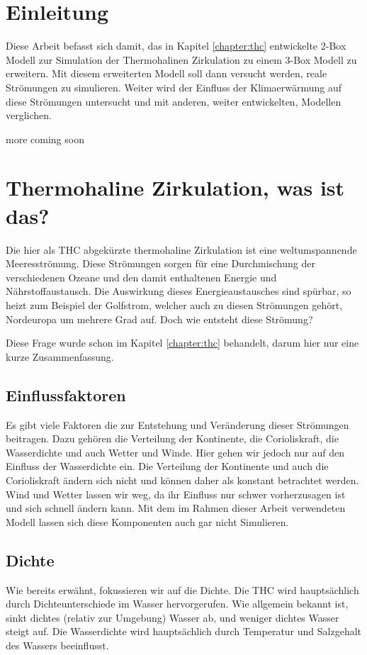 \section{Einleitung}

Diese Arbeit befasst sich damit, das in Kapitel \ref{chapter:thc} entwickelte 2-Box Modell zur Simulation der Thermohalinen Zirkulation zu einem 3-Box Modell zu erweitern. Mit diesem erweiterten Modell soll dann versucht werden, reale Strömungen zu simulieren. Weiter wird der Einfluss der Klimaerwärmung auf diese Strömungen untersucht und mit anderen, weiter entwickelten, Modellen verglichen.

more coming soon

\section{Thermohaline Zirkulation, was ist das?}

Die hier als THC abgekürzte thermohaline Zirkulation ist eine weltumspannende Meeresströmung.
Diese Strömungen sorgen für eine Durchmischung der verschiedenen Ozeane und den damit enthaltenen Energie und Nährstoffaustausch. 
Die Auswirkung dieses Energieaustausches sind spürbar, so heizt zum Beispiel der Golfstrom, welcher auch zu diesen Strömungen gehört, Nordeuropa um mehrere Grad auf.
Doch wie entsteht diese Strömung? 

Diese Frage wurde schon im Kapitel \ref{chapter:thc} behandelt, darum hier nur eine kurze Zusammenfassung. 



\subsection{Einflussfaktoren}
Es gibt viele Faktoren die zur Entstehung und Veränderung dieser Strömungen beitragen. Dazu gehören die Verteilung der Kontinente, die Corioliskraft, die Wasserdichte und auch Wetter und Winde. Hier gehen wir jedoch nur auf den Einfluss der Wasserdichte ein.
Die Verteilung der Kontinente und auch die Corioliskraft ändern sich nicht und können daher als konstant betrachtet werden. Wind und Wetter lassen wir weg, da ihr Einfluss nur schwer vorherzusagen ist und sich schnell ändern kann. Mit dem im Rahmen dieser Arbeit verwendeten Modell lassen sich diese Komponenten auch gar nicht Simulieren.

\subsection{Dichte}
Wie bereits erwähnt, fokussieren wir auf die Dichte.
Die THC wird hauptsächlich durch Dichteunterschiede im Wasser hervorgerufen.
Wie allgemein bekannt ist, sinkt dichtes (relativ zur Umgebung) Wasser ab, und weniger dichtes Wasser steigt auf. Die Wasserdichte wird hauptsächlich durch Temperatur und Salzgehalt des Wassers beeinflusst.

